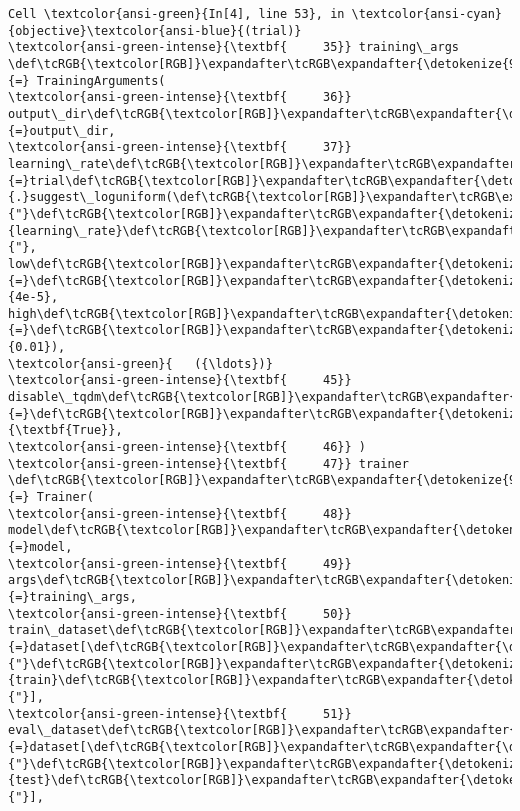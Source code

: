 \documentclass[11pt]{article}
\begin{document}
\begin{Verbatim}[commandchars=\\\{\}, frame=single, framerule=2mm, rulecolor=\color{outerrorbackground}]
Cell \textcolor{ansi-green}{In[4], line 53}, in \textcolor{ansi-cyan}{objective}\textcolor{ansi-blue}{(trial)}
\textcolor{ansi-green-intense}{\textbf{     35}} training\_args \def\tcRGB{\textcolor[RGB]}\expandafter\tcRGB\expandafter{\detokenize{98,98,98}}{=} TrainingArguments(
\textcolor{ansi-green-intense}{\textbf{     36}}     output\_dir\def\tcRGB{\textcolor[RGB]}\expandafter\tcRGB\expandafter{\detokenize{98,98,98}}{=}output\_dir,
\textcolor{ansi-green-intense}{\textbf{     37}}     learning\_rate\def\tcRGB{\textcolor[RGB]}\expandafter\tcRGB\expandafter{\detokenize{98,98,98}}{=}trial\def\tcRGB{\textcolor[RGB]}\expandafter\tcRGB\expandafter{\detokenize{98,98,98}}{.}suggest\_loguniform(\def\tcRGB{\textcolor[RGB]}\expandafter\tcRGB\expandafter{\detokenize{175,0,0}}{"}\def\tcRGB{\textcolor[RGB]}\expandafter\tcRGB\expandafter{\detokenize{175,0,0}}{learning\_rate}\def\tcRGB{\textcolor[RGB]}\expandafter\tcRGB\expandafter{\detokenize{175,0,0}}{"}, low\def\tcRGB{\textcolor[RGB]}\expandafter\tcRGB\expandafter{\detokenize{98,98,98}}{=}\def\tcRGB{\textcolor[RGB]}\expandafter\tcRGB\expandafter{\detokenize{98,98,98}}{4e-5}, high\def\tcRGB{\textcolor[RGB]}\expandafter\tcRGB\expandafter{\detokenize{98,98,98}}{=}\def\tcRGB{\textcolor[RGB]}\expandafter\tcRGB\expandafter{\detokenize{98,98,98}}{0.01}),
\textcolor{ansi-green}{   ({\ldots})}
\textcolor{ansi-green-intense}{\textbf{     45}}     disable\_tqdm\def\tcRGB{\textcolor[RGB]}\expandafter\tcRGB\expandafter{\detokenize{98,98,98}}{=}\def\tcRGB{\textcolor[RGB]}\expandafter\tcRGB\expandafter{\detokenize{0,135,0}}{\textbf{True}},
\textcolor{ansi-green-intense}{\textbf{     46}} )
\textcolor{ansi-green-intense}{\textbf{     47}} trainer \def\tcRGB{\textcolor[RGB]}\expandafter\tcRGB\expandafter{\detokenize{98,98,98}}{=} Trainer(
\textcolor{ansi-green-intense}{\textbf{     48}}     model\def\tcRGB{\textcolor[RGB]}\expandafter\tcRGB\expandafter{\detokenize{98,98,98}}{=}model,
\textcolor{ansi-green-intense}{\textbf{     49}}     args\def\tcRGB{\textcolor[RGB]}\expandafter\tcRGB\expandafter{\detokenize{98,98,98}}{=}training\_args,
\textcolor{ansi-green-intense}{\textbf{     50}}     train\_dataset\def\tcRGB{\textcolor[RGB]}\expandafter\tcRGB\expandafter{\detokenize{98,98,98}}{=}dataset[\def\tcRGB{\textcolor[RGB]}\expandafter\tcRGB\expandafter{\detokenize{175,0,0}}{"}\def\tcRGB{\textcolor[RGB]}\expandafter\tcRGB\expandafter{\detokenize{175,0,0}}{train}\def\tcRGB{\textcolor[RGB]}\expandafter\tcRGB\expandafter{\detokenize{175,0,0}}{"}],
\textcolor{ansi-green-intense}{\textbf{     51}}     eval\_dataset\def\tcRGB{\textcolor[RGB]}\expandafter\tcRGB\expandafter{\detokenize{98,98,98}}{=}dataset[\def\tcRGB{\textcolor[RGB]}\expandafter\tcRGB\expandafter{\detokenize{175,0,0}}{"}\def\tcRGB{\textcolor[RGB]}\expandafter\tcRGB\expandafter{\detokenize{175,0,0}}{test}\def\tcRGB{\textcolor[RGB]}\expandafter\tcRGB\expandafter{\detokenize{175,0,0}}{"}],

\end{Verbatim}
\end{document}
